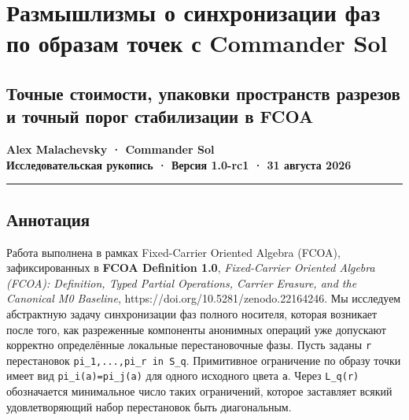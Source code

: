 \hypertarget{ux440ux430ux437ux43cux44bux448ux43bux438ux437ux43cux44b-ux43e-ux441ux438ux43dux445ux440ux43eux43dux438ux437ux430ux446ux438ux438-ux444ux430ux437-ux43fux43e-ux43eux431ux440ux430ux437ux430ux43c-ux442ux43eux447ux435ux43a-ux441-commander-sol}{%
\section{Размышлизмы о синхронизации фаз по образам точек с Commander
Sol}\label{ux440ux430ux437ux43cux44bux448ux43bux438ux437ux43cux44b-ux43e-ux441ux438ux43dux445ux440ux43eux43dux438ux437ux430ux446ux438ux438-ux444ux430ux437-ux43fux43e-ux43eux431ux440ux430ux437ux430ux43c-ux442ux43eux447ux435ux43a-ux441-commander-sol}}

\hypertarget{ux442ux43eux447ux43dux44bux435-ux441ux442ux43eux438ux43cux43eux441ux442ux438-ux443ux43fux430ux43aux43eux432ux43aux438-ux43fux440ux43eux441ux442ux440ux430ux43dux441ux442ux432-ux440ux430ux437ux440ux435ux437ux43eux432-ux438-ux442ux43eux447ux43dux44bux439-ux43fux43eux440ux43eux433-ux441ux442ux430ux431ux438ux43bux438ux437ux430ux446ux438ux438-ux432-fcoa}{%
\subsection{Точные стоимости, упаковки пространств разрезов и точный
порог стабилизации в
FCOA}\label{ux442ux43eux447ux43dux44bux435-ux441ux442ux43eux438ux43cux43eux441ux442ux438-ux443ux43fux430ux43aux43eux432ux43aux438-ux43fux440ux43eux441ux442ux440ux430ux43dux441ux442ux432-ux440ux430ux437ux440ux435ux437ux43eux432-ux438-ux442ux43eux447ux43dux44bux439-ux43fux43eux440ux43eux433-ux441ux442ux430ux431ux438ux43bux438ux437ux430ux446ux438ux438-ux432-fcoa}}

\textbf{Alex Malachevsky · Commander Sol}\\
\textbf{Исследовательская рукопись · Версия 1.0-rc1 · 31 августа 2026}

\begin{center}\rule{0.5\linewidth}{0.5pt}\end{center}

\hypertarget{ux430ux43dux43dux43eux442ux430ux446ux438ux44f}{%
\subsection{Аннотация}\label{ux430ux43dux43dux43eux442ux430ux446ux438ux44f}}

Работа выполнена в рамках Fixed-Carrier Oriented Algebra (FCOA),
зафиксированных в \textbf{FCOA Definition 1.0}, \emph{Fixed-Carrier
Oriented Algebra (FCOA): Definition, Typed Partial Operations, Carrier
Erasure, and the Canonical M0 Baseline},
https://doi.org/10.5281/zenodo.22164246. Мы исследуем абстрактную задачу
синхронизации фаз полного носителя, которая возникает после того, как
разреженные компоненты анонимных операций уже допускают корректно
определённые локальные перестановочные фазы. Пусть заданы \texttt{r}
перестановок \texttt{pi\_1,...,pi\_r\ in\ S\_q}. Примитивное ограничение
по образу точки имеет вид \texttt{pi\_i(a)=pi\_j(a)} для одного
исходного цвета \texttt{a}. Через \texttt{L\_q(r)} обозначается
минимальное число таких ограничений, которое заставляет всякий
удовлетворяющий набор перестановок быть диагональным.

